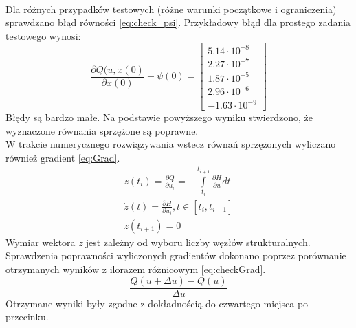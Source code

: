 \paragraph*{}
Dla różnych przypadków testowych (różne warunki początkowe i ograniczenia) sprawdzano błąd równości \eqref{eq:check_psi}. Przykładowy błąd dla prostego zadania testowego wynosi:
\begin{equation}
\frac{\partial Q(u,x(0)}{\partial x(0)}+\psi(0)=
\begin{bmatrix}
5.14\cdot 10^{-8}\\
2.27\cdot 10^{-7}\\
1.87\cdot 10^{-5}\\
2.96\cdot 10^{-6}\\
-1.63\cdot 10^{-9}
\end{bmatrix}
\end{equation}
Błędy są bardzo małe. Na podstawie powyższego wyniku stwierdzono, że wyznaczone równania sprzężone są poprawne.\\
W trakcie numerycznego rozwiązywania wstecz równań sprzężonych wyliczano również gradient \eqref{eq:Grad}.
\begin{equation}
\begin{aligned}
&z(t_i) = \frac{\partial Q}{\partial u_i}=-\int\limits_{t_i}^{t_{i+1}}\frac{\partial H}{\partial u}dt&\\
&\dot{z}(t) = \frac{\partial H}{\partial u_i}, t\in [t_i,t_{i+1}]&\\
&z(t_{i+1}) = 0
\label{eq:Grad}
\end{aligned}
\end{equation}
Wymiar wektora \textit{z} jest zależny od wyboru liczby węzłów strukturalnych. Sprawdzenia poprawności wyliczonych gradientów dokonano poprzez porównanie otrzymanych wyników z ilorazem różnicowym \eqref{eq:checkGrad}.
\begin{equation}
\label{eq:checkGrad}
\frac{Q(u+\Delta u)-Q(u)}{\Delta u}
\end{equation}
Otrzymane wyniki były zgodne z dokładnością do czwartego miejsca po przecinku.